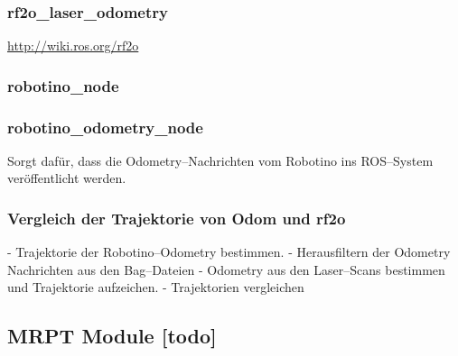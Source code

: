 \begin{comment}
------------------------------------------------------------------------------------------
\end{comment}
\subsubsection{rf2o\_laser\_odometry}

\url{http://wiki.ros.org/rf2o}


\begin{comment}
------------------------------------------------------------------------------------------
\end{comment}
\subsubsection{robotino\_node}


\begin{comment}
------------------------------------------------------------------------------------------
\end{comment}
\subsubsection{robotino\_odometry\_node}

Sorgt dafür, dass die Odometry--Nachrichten vom Robotino ins ROS--System veröffentlicht werden.


\begin{comment}
------------------------------------------------------------------------------------------
\end{comment}
\subsubsection{Vergleich der Trajektorie von Odom und rf2o}

- Trajektorie der Robotino--Odometry bestimmen.
- Herausfiltern der Odometry Nachrichten aus den Bag--Dateien
- Odometry aus den Laser--Scans bestimmen und Trajektorie aufzeichen.
- Trajektorien vergleichen




\begin{comment}
------------------------------------------------------------------------------------------
\end{comment}
\subsection{MRPT Module [todo]}